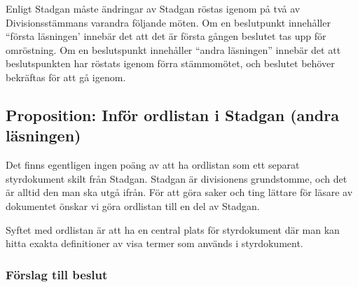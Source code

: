 \documentclass[protokoll]{dvd}
\begin{document}
Enligt Stadgan måste ändringar av Stadgan röstas igenom på två av Divisionsstämmans varandra följande möten.
Om en beslutpunkt innehåller ``första läsningen' innebär det att det är första gången beslutet tas upp för omröstning.
Om en beslutspunkt innehåller ``andra läsningen'' innebär det att beslutspunkten har röstats igenom förra stämmomötet, och beslutet behöver bekräftas för att gå igenom.

\subsection{Proposition: Inför ordlistan i Stadgan (andra läsningen)}

Det finns egentligen ingen poäng av att ha ordlistan som ett separat styrdokument skilt från Stadgan.
Stadgan är divisionens grundstomme, och det är alltid den man ska utgå ifrån.
För att göra saker och ting lättare för läsare av dokumentet önskar vi göra ordlistan till en del av Stadgan.

Syftet med ordlistan är att ha en central plats för styrdokument där man kan hitta exakta definitioner av visa termer som används i styrdokument.

\subsubsection*{Förslag till beslut}
\end{document}

